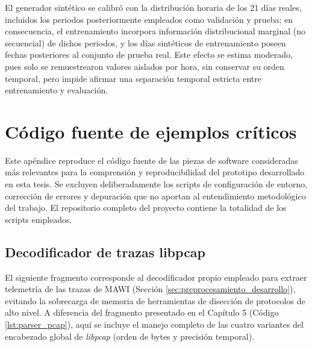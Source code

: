 \documentclass[12pt]{report}
\begin{document}
El generador sintético se calibró con la distribución horaria de los 21 días reales, incluidos los periodos posteriormente empleados como validación y prueba; en consecuencia, el entrenamiento incorpora información distribucional marginal (no secuencial) de dichos periodos, y los días sintéticos de entrenamiento poseen fechas posteriores al conjunto de prueba real. Este efecto se estima moderado, pues solo se remuestrearon valores aislados por hora, sin conservar su orden temporal, pero impide afirmar una separación temporal estricta entre entrenamiento y evaluación.

\clearpage
{}



\appendix
\chapter{Código fuente de ejemplos críticos}

Este apéndice reproduce el código fuente de las piezas de software consideradas más relevantes para la comprensión y reproducibilidad del prototipo desarrollado en esta tesis. Se excluyen deliberadamente los scripts de configuración de entorno, corrección de errores y depuración que no aportan al entendimiento metodológico del trabajo. El repositorio completo del proyecto contiene la totalidad de los scripts empleados.

\section{Decodificador de trazas libpcap}
\label{apx:decodificador_libpcap}

El siguiente fragmento corresponde al decodificador propio empleado para extraer telemetría de las trazas de MAWI (Sección \ref{sec:preprocesamiento_desarrollo}), evitando la sobrecarga de memoria de herramientas de disección de protocolos de alto nivel. A diferencia del fragmento presentado en el Capítulo 5 (Código \ref{lst:parser_pcap}), aquí se incluye el manejo completo de las cuatro variantes del encabezado global de \textit{libpcap} (orden de bytes y precisión temporal).
\end{document}
